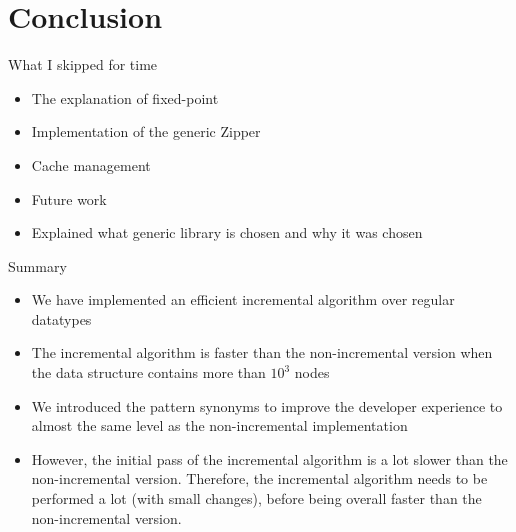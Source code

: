 \section{Conclusion}

\begin{slide}{What I skipped for time}
\begin{itemize}
  \item The explanation of fixed-point
  \item Implementation of the generic Zipper
  \item Cache management
  \item Future work
  \item Explained what generic library is chosen and why it was chosen
\end{itemize}
\end{slide}

\begin{slide}{Summary}
\begin{itemize}
  \item We have implemented an efficient incremental algorithm over regular datatypes
  \item The incremental algorithm is faster than the non-incremental version when the data structure contains more than $10^3$ nodes
  \item We introduced the pattern synonyms to improve the developer experience to almost the same
  level as the non-incremental implementation
  \item However, the initial pass of the incremental algorithm is a lot slower than the non-incremental version. Therefore, the incremental algorithm needs to be performed a lot (with small changes), before being overall faster than the non-incremental version.
\end{itemize}
\end{slide}